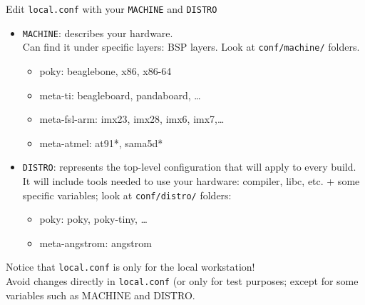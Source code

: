 \documentclass[ucs,9pt]{beamer}
\begin{document}
\begin{frame}[fragile]
    Edit \texttt{local.conf} with your \texttt{MACHINE} and \texttt{DISTRO}
    \begin{itemize}
        \item \texttt{MACHINE}: describes your hardware.\\ Can find it under specific layers: BSP layers. Look at \texttt{conf/machine/} folders.
        \begin{itemize}
            \item poky: beaglebone, x86, x86-64
            \item meta-ti: beagleboard, pandaboard, \dots
            \item meta-fsl-arm: imx23, imx28, imx6, imx7,\dots
            \item meta-atmel: at91*, sama5d*
        \end{itemize}
        \item \texttt{DISTRO}: represents the top-level configuration that will apply to every build. It will include tools needed to use your hardware: compiler, libc, etc. + some specific variables; look at \texttt{conf/distro/} folders:
        \begin{itemize}
            \item poky: poky, poky-tiny, \dots
            \item meta-angstrom: angstrom
        \end{itemize}
    \end{itemize}
    Notice that \texttt{local.conf} is only for the local workstation!\\
    Avoid changes directly in \texttt{local.conf} (or only for test purposes; except for some variables such as MACHINE and DISTRO.
\end{frame}
\end{document}
